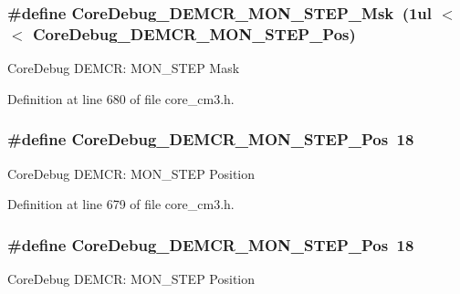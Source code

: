 \subsubsection[{\texorpdfstring{Core\+Debug\+\_\+\+D\+E\+M\+C\+R\+\_\+\+M\+O\+N\+\_\+\+S\+T\+E\+P\+\_\+\+Msk}{CoreDebug_DEMCR_MON_STEP_Msk}}]{\setlength{\rightskip}{0pt plus 5cm}\#define Core\+Debug\+\_\+\+D\+E\+M\+C\+R\+\_\+\+M\+O\+N\+\_\+\+S\+T\+E\+P\+\_\+\+Msk~(1ul $<$$<$ Core\+Debug\+\_\+\+D\+E\+M\+C\+R\+\_\+\+M\+O\+N\+\_\+\+S\+T\+E\+P\+\_\+\+Pos)}\hypertarget{group___c_m_s_i_s___c_m3___core_debug_ga2ded814556de96fc369de7ae9a7ceb98}{}\label{group___c_m_s_i_s___c_m3___core_debug_ga2ded814556de96fc369de7ae9a7ceb98}
Core\+Debug D\+E\+M\+CR\+: M\+O\+N\+\_\+\+S\+T\+EP Mask 

Definition at line 680 of file core\+\_\+cm3.\+h.

\subsubsection[{\texorpdfstring{Core\+Debug\+\_\+\+D\+E\+M\+C\+R\+\_\+\+M\+O\+N\+\_\+\+S\+T\+E\+P\+\_\+\+Pos}{CoreDebug_DEMCR_MON_STEP_Pos}}]{\setlength{\rightskip}{0pt plus 5cm}\#define Core\+Debug\+\_\+\+D\+E\+M\+C\+R\+\_\+\+M\+O\+N\+\_\+\+S\+T\+E\+P\+\_\+\+Pos~18}\hypertarget{group___c_m_s_i_s___c_m3___core_debug_ga9ae10710684e14a1a534e785ef390e1b}{}\label{group___c_m_s_i_s___c_m3___core_debug_ga9ae10710684e14a1a534e785ef390e1b}
Core\+Debug D\+E\+M\+CR\+: M\+O\+N\+\_\+\+S\+T\+EP Position 

Definition at line 679 of file core\+\_\+cm3.\+h.

\subsubsection[{\texorpdfstring{Core\+Debug\+\_\+\+D\+E\+M\+C\+R\+\_\+\+M\+O\+N\+\_\+\+S\+T\+E\+P\+\_\+\+Pos}{CoreDebug_DEMCR_MON_STEP_Pos}}]{\setlength{\rightskip}{0pt plus 5cm}\#define Core\+Debug\+\_\+\+D\+E\+M\+C\+R\+\_\+\+M\+O\+N\+\_\+\+S\+T\+E\+P\+\_\+\+Pos~18}\hypertarget{group___c_m_s_i_s___c_m3___core_debug_ga9ae10710684e14a1a534e785ef390e1b}{}\label{group___c_m_s_i_s___c_m3___core_debug_ga9ae10710684e14a1a534e785ef390e1b}
Core\+Debug D\+E\+M\+CR\+: M\+O\+N\+\_\+\+S\+T\+EP Position 

